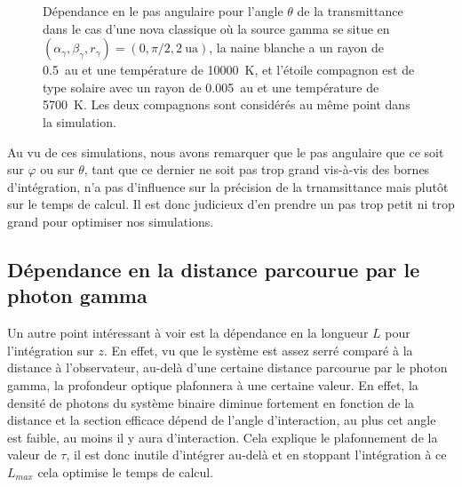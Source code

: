 \documentclass[a4paper,12pt,twoside]{article}
\begin{document}
\begin{figure}[H]
	\centering
    \hfill
    \hfill
    \caption{Dépendance en le pas angulaire pour l'angle $\theta$ de la transmittance dans le cas d'une nova classique où la source gamma se situe en $(\alpha_\gamma, \beta_\gamma, r_\gamma) = (0, \pi/2, \SI{2}{\astronomicalunit})$, la naine blanche a un rayon de \SI{0.5}{\astronomicalunit} et une température de \SI{10000}{\K}, et l'étoile compagnon est de type solaire avec un rayon de \SI{0.005}{\astronomicalunit} et une température de \SI{5700}{\K}. Les deux compagnons sont considérés au même point dans la simulation.}
    \label{fig: delta theta}
\end{figure}

Au vu de ces simulations, nous avons remarquer que le pas angulaire que ce soit sur $\varphi$ ou sur $\theta$, tant que ce dernier ne soit pas trop grand vis-à-vis des bornes d'intégration, n'a pas d'influence sur la précision de la trnamsittance mais plutôt sur le temps de calcul. Il est donc judicieux d'en prendre un pas trop petit ni trop grand pour optimiser nos simulations.

\subsection{Dépendance en la distance parcourue par le photon gamma}

Un autre point intéressant à voir est la dépendance en la longueur $L$ pour l'intégration sur $z$. En effet, vu que le système est assez serré comparé à la distance à l'observateur, au-delà d'une certaine distance parcourue par le photon gamma, la profondeur optique plafonnera à une certaine valeur. En effet, la densité de photons du système binaire diminue fortement en fonction de la distance et la section efficace dépend de l'angle d'interaction, au plus cet angle est faible, au moins il y aura d'interaction. Cela explique le plafonnement de la valeur de $\tau$, il est donc inutile d'intégrer au-delà et en stoppant l'intégration à ce $L_{max}$ cela optimise le temps de calcul.
\end{document}
